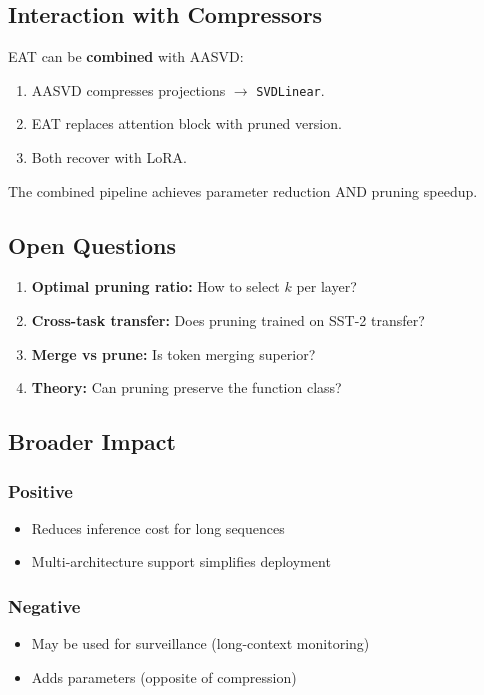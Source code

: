 \subsection{Interaction with Compressors}

EAT can be \textbf{combined} with AASVD:

\begin{enumerate}
\item AASVD compresses projections $\to$ \texttt{SVDLinear}.
\item EAT replaces attention block with pruned version.
\item Both recover with LoRA.

\end{enumerate}
The combined pipeline achieves parameter reduction AND pruning speedup.

\subsection{Open Questions}

\begin{enumerate}
\item \textbf{Optimal pruning ratio:} How to select $k$ per layer?
\item \textbf{Cross-task transfer:} Does pruning trained on SST-2 transfer?
\item \textbf{Merge vs prune:} Is token merging superior?
\item \textbf{Theory:} Can pruning preserve the function class?

\end{enumerate}
\subsection{Broader Impact}

\subsubsection{Positive}
\begin{itemize}
\item Reduces inference cost for long sequences
\item Multi-architecture support simplifies deployment

\end{itemize}
\subsubsection{Negative}
\begin{itemize}
\item May be used for surveillance (long-context monitoring)
\item Adds parameters (opposite of compression)

\end{itemize}
